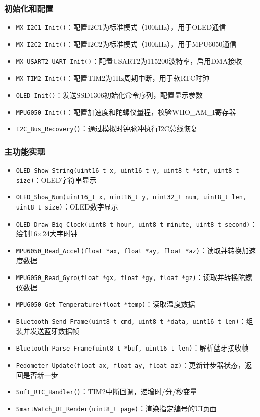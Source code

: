 \subsubsection{初始化和配置}
\begin{itemize}
    \item \verb|MX_I2C1_Init()|：配置I2C1为标准模式（100kHz），用于OLED通信
    \item \verb|MX_I2C2_Init()|：配置I2C2为标准模式（100kHz），用于MPU6050通信
    \item \verb|MX_USART2_UART_Init()|：配置USART2为115200波特率，启用DMA接收
    \item \verb|MX_TIM2_Init()|：配置TIM2为1Hz周期中断，用于软RTC时钟
    \item \verb|OLED_Init()|：发送SSD1306初始化命令序列，配置显示参数
    \item \verb|MPU6050_Init()|：配置加速度和陀螺仪量程，校验WHO\_AM\_I寄存器
    \item \verb|I2C_Bus_Recovery()|：通过模拟时钟脉冲执行I2C总线恢复
\end{itemize}

\subsubsection{主功能实现}
\begin{itemize}
    \item \verb|OLED_Show_String(uint16_t x, uint16_t y, uint8_t *str, uint8_t size)|：OLED字符串显示
    \item \verb|OLED_Show_Num(uint16_t x, uint16_t y, uint32_t num, uint8_t len, uint8_t size)|：OLED数字显示
    \item \verb|OLED_Draw_Big_Clock(uint8_t hour, uint8_t minute, uint8_t second)|：绘制16$\times$24大字时钟
    \item \verb|MPU6050_Read_Accel(float *ax, float *ay, float *az)|：读取并转换加速度数据
    \item \verb|MPU6050_Read_Gyro(float *gx, float *gy, float *gz)|：读取并转换陀螺仪数据
    \item \verb|MPU6050_Get_Temperature(float *temp)|：读取温度数据
    \item \verb|Bluetooth_Send_Frame(uint8_t cmd, uint8_t *data, uint16_t len)|：组装并发送蓝牙数据帧
    \item \verb|Bluetooth_Parse_Frame(uint8_t *buf, uint16_t len)|：解析蓝牙接收帧
    \item \verb|Pedometer_Update(float ax, float ay, float az)|：更新计步器状态，返回是否新一步
    \item \verb|Soft_RTC_Handler()|：TIM2中断回调，递增时/分/秒变量
    \item \verb|SmartWatch_UI_Render(uint8_t page)|：渲染指定编号的UI页面
\end{itemize}

